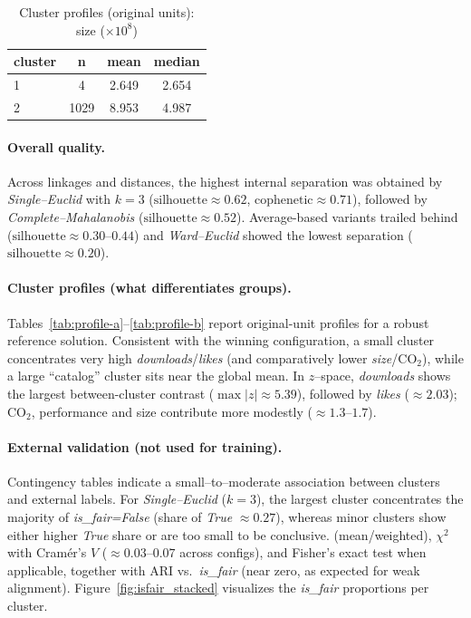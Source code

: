 \documentclass[journal]{IEEEtran}
\begin{document}
\begin{table}[t]
	\centering
	\small
	\caption{Cluster profiles (original units): size ($\times 10^{8}$)}
	\label{tab:profile-c}
	\renewcommand{\arraystretch}{1.1}
	\begin{tabular}{l S[table-format=4.0] S[table-format=1.3] S[table-format=1.3]}
		\toprule
		\textbf{cluster} & \textbf{n} & \textbf{mean} & \textbf{median} \\
		 & 4    & 2.649 & 2.654 \\
		2 & 1029 & 8.953 & 4.987 \\
		\bottomrule
	\end{tabular}
\end{table}

\paragraph{Overall quality.}
Across linkages and distances, the highest internal separation was obtained by \emph{Single–Euclid} with $k=3$
($\text{silhouette}\approx 0.62$, $\text{cophenetic}\approx 0.71$), followed by \emph{Complete–Mahalanobis}
($\text{silhouette}\approx 0.52$). Average-based variants trailed behind
($\text{silhouette}\approx 0.30$–$0.44$) and \emph{Ward–Euclid} showed the lowest separation
($\text{silhouette}\approx 0.20$).

\paragraph{Cluster profiles (what differentiates groups).}
Tables~\ref{tab:profile-a}–\ref{tab:profile-b} report original-unit profiles for a robust
reference solution. Consistent with the winning configuration, a small cluster concentrates very high
\emph{downloads}/\emph{likes} (and comparatively lower \emph{size}/CO$_2$), while a large “catalog” cluster
sits near the global mean. In $z$–space, \emph{downloads} shows the largest between-cluster contrast
($\max|z|\approx 5.39$), followed by \emph{likes} ($\approx 2.03$); CO$_2$, performance and size contribute
more modestly ($\approx 1.3$–$1.7$).

\paragraph{External validation (not used for training).}
Contingency tables indicate a small–to–moderate association between clusters and external labels.
For \emph{Single–Euclid} ($k=3$), the largest cluster concentrates the majority of \emph{is\_fair=False}
(share of \emph{True} $\approx 0.27$), whereas minor clusters show either higher \emph{True} share or are too small
to be conclusive.  (mean/weighted),
$\chi^{2}$ with Cramér’s $V$ ($\approx 0.03$–$0.07$ across configs), and Fisher’s exact test when applicable,
together with ARI vs.~\emph{is\_fair} (near zero, as expected for weak alignment).
Figure~\ref{fig:isfair_stacked} visualizes the \emph{is\_fair} proportions per cluster.
\end{document}
